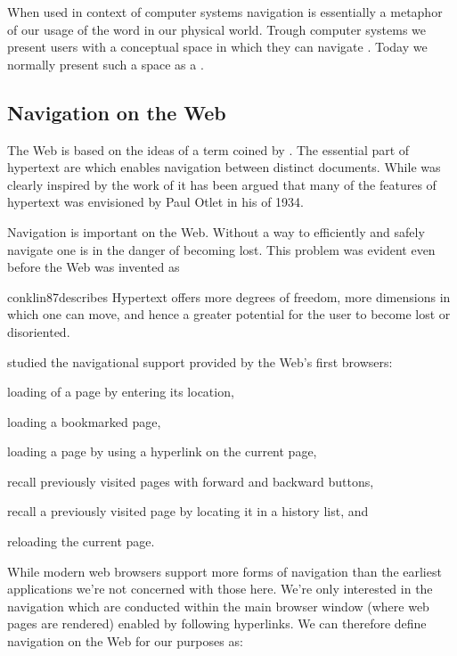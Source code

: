 When used in context of
computer systems navigation is essentially a metaphor of our usage of the
word in our physical world. Trough computer systems we present users with a
conceptual space in which they can navigate \citep[]{whiteside85}.
Today we normally present such a space as a .%

\subsection{Navigation on the Web}
\label{section:background.navigation.navigation.on.the.web}

The Web is based on the ideas of \dash{}a term coined by
\citet[]{nelson65}. The essential part of hypertext are
 \citep[]{nelson65} which enables navigation between
distinct documents. While \citeauthor{nelson65} was clearly
inspired by the work of \citet{bush45} it has been argued \citep{rayward94}
that many of the features of hypertext was envisioned by Paul Otlet in his
 of 1934.

Navigation is important on the Web. Without a way to efficiently and safely
navigate one is in the danger of becoming lost. This problem was evident even
before the Web was invented as
\begin{fullquote}[\p{38}]{conklin87}{describes}
  Hypertext offers more degrees of freedom, more dimensions in which one
  can move, and hence a greater potential for the user
  to become lost or disoriented.
\end{fullquote}

\citet{jones96} studied the navigational support provided by the Web's first
browsers:
\begin{inparaenum}[(i)]
  \item loading of a page by entering its location,
  \item loading a bookmarked page,
  \item loading a page by using a hyperlink on the current page,
  \item recall previously visited pages with forward and backward buttons,
  \item recall a previously visited page by locating it in a history list, and
  \item reloading the current page.
\end{inparaenum}
While modern web browsers support more forms of navigation%
than the earliest applications we're not concerned with those here.
We're only interested in the navigation which are conducted within the main
browser window (where web pages are rendered) enabled by following hyperlinks.
We can therefore define navigation on the Web for our purposes as:


